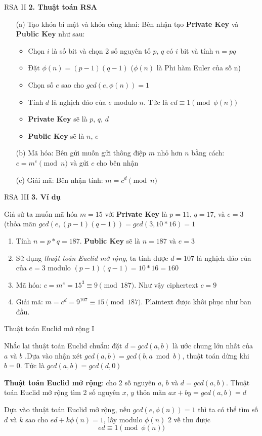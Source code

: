 \begin{frame}{RSA II}
\textbf{2. Thuật toán RSA}
\begin{enumerate}
    \item [(a)] Tạo khóa bí mật và khóa công khai: Bên nhận tạo \textbf{Private Key} và \textbf{Public Key} như sau:
    \begin{itemize}
        \item Chọn $i$ là số bit và chọn 2 số nguyên tố $p$, $q$ có $i$ bit và tính $n=pq$
        \item Đặt $\phi(n)=(p-1)(q-1)$ ($\phi(n)$ là Phi hàm Euler của số n)
        \item Chọn số $e$ sao cho $gcd(e, \phi(n))=1$
        \item Tính $d$ là nghịch đảo của $e$ modulo $n$. Tức là $ed \equiv 1 \pmod {\phi(n)}$
        \item \textbf{Private Key} sẽ là $p$, $q$, $d$
        \item \textbf{Public Key} sẽ là $n$, $e$
    \end{itemize}
    \item [(b)] Mã hóa: Bên gửi muốn gửi thông điệp $m$ nhỏ hơn $n$ bằng cách: $c = m^e \pmod n$ và gửi $c$ cho bên nhận
    \item [(c)] Giải mã: Bên nhận tính: $m = c^d \pmod n$
\end{enumerate}
\end{frame}

\begin{frame}{RSA III}
\textbf{3. Ví dụ}

Giả sử ta muốn mã hóa $m=15$ với \textbf{Private Key} là $p=11$, $q=17$, và $e=3$ (thỏa mãn $gcd(e, (p-1)(q-1))=gcd(3, 10*16)=1$

\begin{enumerate}
    \item Tính $n=p*q=187$. \textbf{Public Key} sẽ là $n=187$ và $e=3$
    \item Sử dụng \textit{thuật toán Euclid mở rộng}, ta tính được $d=107$ là nghịch đảo của của $e=3$ modulo $(p-1)(q-1)=10*16=160$ 
    \item Mã hóa: $c=m^e=15^{3} \equiv 9 \pmod{187}$. Như vậy ciphertext $c=9$
    \item Giải mã: $m=c^d=9^{107} \equiv 15 \pmod{187}$. Plaintext được khôi phục như ban đầu.
\end{enumerate}
\end{frame}

\begin{frame}{Thuật toán Euclid mở rộng I}

Nhắc lại thuật toán Euclid chuẩn: đặt $d=gcd(a,b)$ là ước chung lớn nhất của $a$ và $b$ .Dựa vào nhận xét $gcd(a, b) = gcd(b, a \bmod b)$, thuật toán dừng khi $b=0$. Tức là $gcd(a, b) = gcd(d, 0)$

\textbf{Thuật toán Euclid mở rộng}: cho 2 số nguyên $a$, $b$ và $d=gcd(a, b)$. Thuật toán Euclid mở rộng tìm 2 số nguyên $x$, $y$ thỏa mãn $ax+by=gcd(a, b)=d$

Dựa vào thuật toán Euclid mở rộng, nếu $gcd(e, \phi(n))=1$ thì ta có thể tìm số $d$ và $k$ sao cho $ed + k \phi(n) = 1$, lấy modulo $\phi(n)$ 2 vế thu được \[ed \equiv 1 \pmod{\phi(n)} \]
\end{frame}

